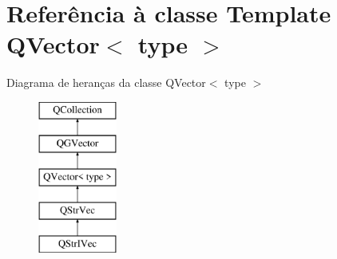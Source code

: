 \hypertarget{class_q_vector}{\section{Referência à classe Template Q\-Vector$<$ type $>$}
\label{class_q_vector}
}
Diagrama de heranças da classe Q\-Vector$<$ type $>$\begin{figure}[H]
\begin{center}
\leavevmode
\includegraphics[height=5.000000cm]{class_q_vector}
\end{center}
\end{figure}
